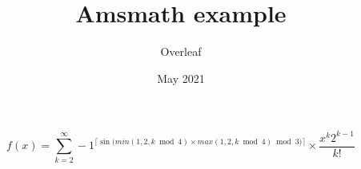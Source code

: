 \documentclass[10pt]{beamer}
\title{Amsmath example}
\author{Overleaf}
\date{May 2021}
\begin{document}
\[
f(x) = \sum_{k=2}^{\infty} -1^{\lceil \sin{(min(1, 2, k \bmod{4}) \times max(1, 2, k \bmod{4})} \bmod{3}) \rceil} \times \frac{x^k 2^{k - 1}}{k!}
\]
\end{document}
